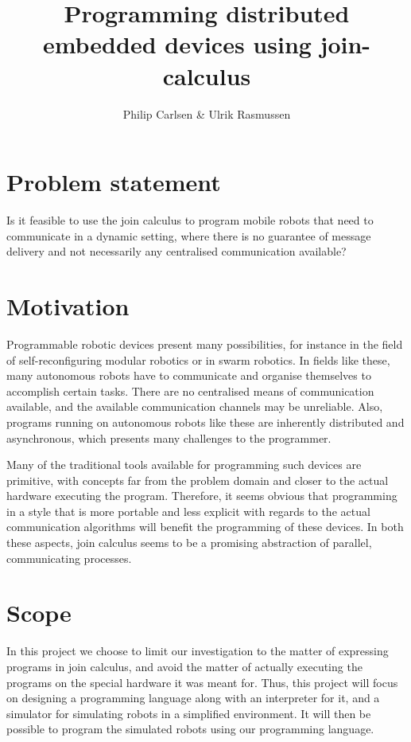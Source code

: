 \documentclass[a4paper, 11pt, oneside, report]{memoir}
\title{Programming distributed embedded devices using join-calculus}
\author{Philip Carlsen \& Ulrik Rasmussen}
\begin{document}
\maketitle

\section*{Problem statement}

Is it feasible to use the join calculus\cite{join-calculus} to program mobile
robots that need to communicate in a dynamic setting, where there is no
guarantee of message delivery and not necessarily any centralised communication
available?

\section*{Motivation}

Programmable robotic devices present many possibilities, for instance in the
field of self-reconfiguring modular robotics or in swarm robotics. In fields
like these, many autonomous robots have to communicate and organise themselves
to accomplish certain tasks.  There are no centralised means of communication
available, and the available communication channels may be unreliable. Also,
programs running on autonomous robots like these are inherently distributed and
asynchronous, which presents many challenges to the programmer.

Many of the traditional tools available for programming such devices are
primitive, with concepts far from the problem domain and closer to the actual
hardware executing the program. Therefore, it seems obvious that programming in
a style that is more portable and less explicit with regards to the actual
communication algorithms will benefit the programming of these devices. In both
these aspects, join calculus seems to be a promising abstraction of parallel,
communicating processes.

\section*{Scope}

In this project we choose to limit our investigation to the matter of
expressing programs in join calculus, and avoid the matter of actually
executing the programs on the special hardware it was meant for.
Thus, this project will focus on designing a programming language along with an
interpreter for it, and a simulator for simulating robots in a simplified
environment. It will then be possible to program the simulated robots using our
programming language.
\end{document}
